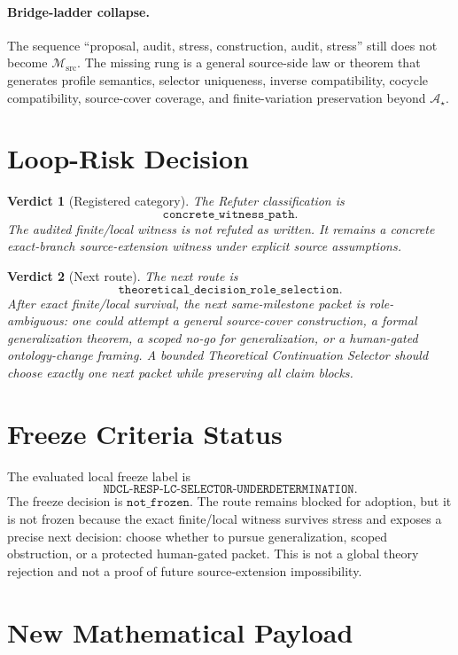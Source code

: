 \documentclass[11pt]{article}
\newcommand{\Msrc}{\mathcal{M}_{\mathrm{src}}}
\newcommand{\Astar}{\mathcal A_{\star}}
\newtheorem{verdict}{Verdict}
\begin{document}
\paragraph{Bridge-ladder collapse.}
The sequence ``proposal, audit, stress, construction, audit, stress'' still
does not become \(\Msrc\). The missing rung is a general source-side law or
theorem that generates profile semantics, selector uniqueness, inverse
compatibility, cocycle compatibility, source-cover coverage, and
finite-variation preservation beyond \(\Astar\).

\section{Loop-Risk Decision}

\begin{verdict}[Registered category]
The Refuter classification is
\[
  \texttt{concrete\_witness\_path}.
\]
The audited finite/local witness is not refuted as written. It remains a
concrete exact-branch source-extension witness under explicit source
assumptions.
\end{verdict}

\begin{verdict}[Next route]
The next route is
\[
  \texttt{theoretical\_decision\_role\_selection}.
\]
After exact finite/local survival, the next same-milestone packet is
role-ambiguous: one could attempt a general source-cover construction, a
formal generalization theorem, a scoped no-go for generalization, or a
human-gated ontology-change framing. A bounded Theoretical Continuation
Selector should choose exactly one next packet while preserving all claim
blocks.
\end{verdict}

\section{Freeze Criteria Status}

The evaluated local freeze label is
\[
\texttt{NDCL-RESP-LC-SELECTOR-UNDERDETERMINATION}.
\]
The freeze decision is \(\texttt{not\_frozen}\). The route remains blocked
for adoption, but it is not frozen because the exact finite/local witness
survives stress and exposes a precise next decision: choose whether to pursue
generalization, scoped obstruction, or a protected human-gated packet. This
is not a global theory rejection and not a proof of future source-extension
impossibility.

\section{New Mathematical Payload}
\end{document}
